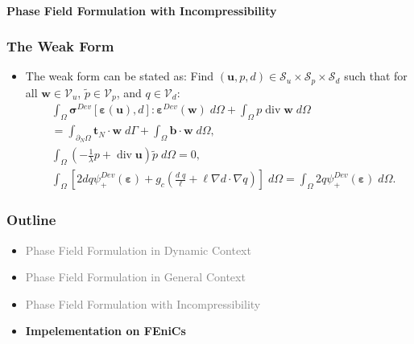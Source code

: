 \documentclass{beamer}
\newcommand{\SectionOne}{Phase Field Formulation in Dynamic Context}
\newcommand{\SectionTwo}{Phase Field Formulation in General Context}
\newcommand{\SectionThree}{Phase Field Formulation with Incompressibility}
\newcommand{\SectionFour}{Impelementation on FEniCs}
\DeclareMathOperator{\divergence}{div}
\begin{document}
\begin{frame}
	\framesubtitle{\SectionThree}
	\frametitle{The Weak Form}
	\begin{itemize}
		\setlength\itemsep{2em}
		\item The weak form can be stated as: Find $(\bm{u},p,d)\in\mathscr{S}_u\times\mathscr{S}_p\times\mathscr{S}_d$ such that for all $\bm{w}\in\mathscr{V}_u$, $\tilde{p}\in\mathscr{V}_p$, and $q\in \mathscr{V}_d$:
		\begin{subequations}
		\begin{align*}
		&\int_\Omega \bm{\sigma}^{Dev}[\bm{\varepsilon}(\bm{u}), d] : \bm{\varepsilon}^{Dev}(\bm{w}) \;d\Omega + \int_\Omega p\divergence\bm{w} \;d\Omega\\
		&= \int_{\partial_N\Omega} \bm{t}_N\cdot \bm{w} \; d\Gamma + \int_\Omega \mathbf{b}\cdot\bm{w} \; d\Omega,\\
		&\int_{\Omega} \left({-}\frac{1}{\lambda}p+\divergence\bm{u}\right)\tilde{p}\; d\Omega=0,\\
		&\int_\Omega \left[2d q \psi^{Dev}_+(\bm{\varepsilon})+g_c\left(\frac{d\;q}{\ell} + \ell \nabla d\cdot\nabla q\right)\right]\;d\Omega =
		\int_\Omega 2q \psi^{Dev}_+(\bm{\varepsilon}) \;d\Omega.
		\end{align*}			
		\end{subequations}
	\end{itemize}
\end{frame}

\begin{frame}
	\frametitle{Outline}
	\begin{itemize}
		\setlength\itemsep{2em}
		\item \textcolor{gray}{\SectionOne}
		\item \textcolor{gray}{\SectionTwo}
		\item \textcolor{gray}{\SectionThree}
		\item \textbf{\SectionFour}
	\end{itemize}
\end{frame}
\end{document}
